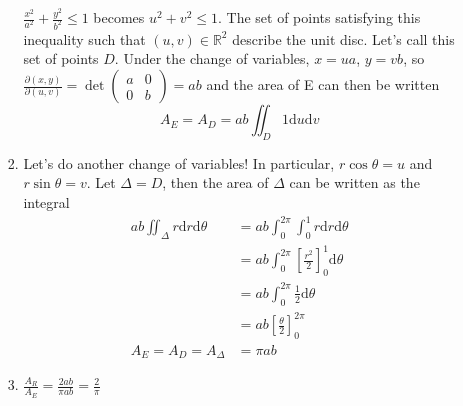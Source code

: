 \documentclass[10pt]{article}
\begin{document}
\begin{enumerate}
\begin{enumerate}
\begin{enumerate}
                            $\tfrac{x^2}{a^2} + \tfrac{y^2}{b^2} \leq 1$
                            becomes $u^2 + v^2 \leq 1$. The set of points
                            satisfying this inequality such that $(u,v) \in
                            \mathbb{R}^2$ describe the unit disc.
                            Let's call this set of points $D$. Under the change
                            of variables, $x = ua$, $y = vb$, so
                            $
                                \tfrac{\partial(x,y)}{\partial(u,v)} = \det\left(
                                \begin{array}{cc}
                                    a & 0 \\
                                    0 & b
                                \end{array}
                                \right) = ab
                            $ and the area of E can then be written
                            $$
                            A_E = A_D = ab\iint_D 1 \text{d}u\text{d}v
                            $$
                        \pagebreak
                        \item Let's do another change of variables! In
                            particular, $r\cos\theta = u$ and $r\sin\theta = v$.
                            Let $\Delta = D$, then the area of $\Delta$ can be
                            written as the integral
                            \begin{align*}
                                ab\iint_\Delta r \text{d}r\text{d}\theta &= ab\int_0^{2\pi}\int_0^1 r \text{d}r\text{d}\theta \\
                                &= ab\int_0^{2\pi}\left[\frac{r^2}{2}\right]_0^1\text{d}\theta \\
                                &= ab\int_0^{2\pi}\frac{1}{2}\text{d}\theta \\
                                &= ab\left[\frac{\theta}{2}\right]_0^{2\pi} \\
                                A_E = A_D = A_\Delta &= \pi ab
                            \end{align*}
                        \item $\frac{A_R}{A_E} = \frac{2ab}{\pi ab} = \frac{2}{\pi}$


\end{enumerate}
\end{enumerate}
\end{enumerate}
\end{document}
